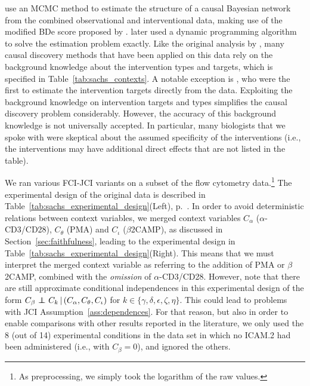 \documentclass[twoside,11pt]{article}
\DeclareMathOperator*{\CI}{{\,\perp\mkern-12mu\perp\,}}
\newcommand\given{\,|\,}
\begin{document}
\citet{SPP05} use an MCMC method to estimate the structure of a
causal Bayesian network from the combined observational and interventional data, making use of the modified
BDe score proposed by \citet{CooperYoo1999}. \citet{EatonMurphy07} later used a dynamic programming
algorithm to solve the estimation problem exactly.
Like the original analysis by \citet{SPP05}, many causal discovery methods
that have been applied on this data rely on the background knowledge about the intervention
types and targets, which is specified in Table~\ref{tab:sachs_contexts}. A notable exception
is \citet{EatonMurphy07}, who were the first to estimate the intervention targets directly from the data. 
Exploiting the background knowledge on intervention targets and types simplifies the causal 
discovery problem considerably.
However, the accuracy of this background knowledge is not universally accepted. In
particular, many biologists that we spoke with were skeptical about the assumed specificity of the interventions
(i.e., the interventions may have additional direct effects that are not listed in the table).

We ran various FCI-JCI variants on a subset of the flow cytometry data.\footnote{As preprocessing, we simply took the logarithm of the raw values.}
The experimental design of the original data is described in Table~\ref{tab:sachs_experimental_design}(Left), p.\ \pageref{tab:sachs_experimental_design}. 
In order to avoid deterministic relations between context variables, we merged
context variables $C_\alpha$ ($\alpha$-CD3/CD28), $C_\theta$ (PMA) and $C_\iota$ ($\beta$2CAMP),
as discussed in Section~\ref{sec:faithfulness}, leading to the experimental design in Table~\ref{tab:sachs_experimental_design}(Right).
This means that we must interpret the merged context variable as referring to the addition of PMA or $\beta$2CAMP, combined with the \emph{omission} of $\alpha$-CD3/CD28. 
However, note that there are still approximate conditional independences in this experimental design of the form 
$C_\beta \CI C_k \given (C_\alpha,C_\theta,C_\iota)$ for $k \in \{\gamma,\delta,\epsilon,\zeta,\eta\}$.
This could lead to problems with JCI Assumption~\ref{ass:dependences}.
For that reason, but also in order to enable comparisons with other results reported in the literature, we only used the 8 (out of 14) experimental conditions in the data set in which no ICAM.2 had been administered (i.e., with $C_\beta=0$), and ignored the others.
\end{document}
